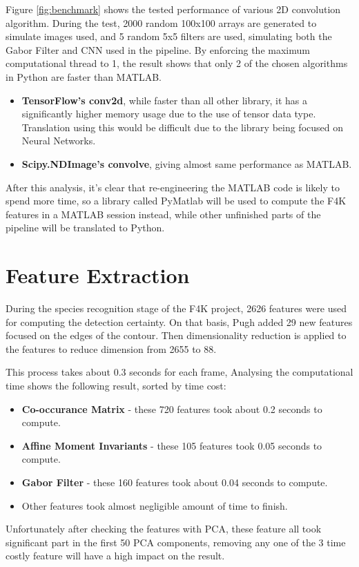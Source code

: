 \documentclass[bsc,logo,twoside,fullspacing,parskip]{infthesis}
\begin{document}
Figure \ref{fig:benchmark} shows the tested performance of various 2D convolution algorithm. During the test, 2000 random 100x100 arrays are generated to simulate images used, and 5 random 5x5 filters are used, simulating both the Gabor Filter and CNN used in the pipeline. By enforcing the maximum computational thread to 1, the result shows that only 2 of the chosen algorithms in Python are faster than MATLAB.
\begin{itemize}
\setlength{\parskip}{1pt}
\item
\textbf{TensorFlow's conv2d}, while faster than all other library, it has a significantly higher memory usage due to the use of tensor data type. Translation using this would be difficult due to the library being focused on Neural Networks.
\item
\textbf{Scipy.NDImage's convolve}, giving almost same performance as MATLAB.
\end{itemize}

After this analysis, it's clear that re-engineering the MATLAB code is likely to spend more time, so a library called PyMatlab will be used to compute the F4K features in a MATLAB session instead, while other unfinished parts of the pipeline will be translated to Python.

\section{Feature Extraction}

During the species recognition stage of the F4K project, 2626 features were used for computing the detection certainty.
On that basis, Pugh added 29 new features focused on the edges of the contour. 
Then dimensionality reduction is applied to the features to reduce dimension from 2655 to 88.

This process takes about 0.3 seconds for each frame, Analysing the computational time shows the following result, sorted by time cost:
\begin{itemize}
\setlength{\parskip}{1pt}
\item
\textbf{Co-occurance Matrix} - these 720 features took about 0.2 seconds to compute.
\item
\textbf{Affine Moment Invariants} - these 105 features took 0.05 seconds to compute.
\item
\textbf{Gabor Filter} - these 160 features took about 0.04 seconds to compute.
\item Other features took almost negligible amount of time to finish.
\end{itemize}
Unfortunately after checking the features with PCA, these feature all took significant part in the first 50 PCA components, removing any one of the 3 time costly feature will have a high impact on the result.
\end{document}
